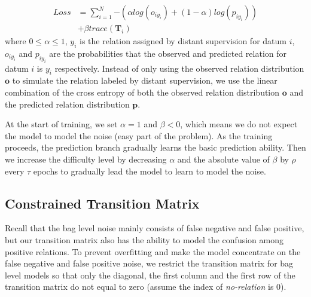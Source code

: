 \begin{equation}
\begin{aligned}
Loss	&=\sum_{i=1}^N{-(\alpha log(o_{iy_{i}}) + (1-\alpha) log(p_{iy_{i}}))} \\
&+ \beta trace(\mathbf{T}_{i})
\end{aligned}
\end{equation}
where $0\le\alpha\le1$, $y_i$ is the relation assigned by distant supervision for datum $i$, $o_{iy_{i}}$ and $p_{iy_{i}}$ are the probabilities that the observed and predicted relation for datum $i$ is $y_i$ respectively. Instead of only using the observed relation distribution $\mathbf{o}$ to simulate the relation labeled by distant supervision, we use the linear combination of the cross entropy of both the observed relation distribution $\mathbf{o}$ and the predicted relation distribution $\mathbf{p}$. 

At the start of training, we set $\alpha=1$ and $\beta<0$, which means we do not expect the model to model the noise (easy part of the problem). As the training proceeds, the prediction branch gradually learns the basic prediction ability. Then we increase the difficulty level by decreasing $\alpha$ and the absolute value of $\beta$ by $\rho$ every $\tau$ epochs to gradually lead the model to learn to model the noise.  

\subsection{Constrained Transition Matrix}
Recall that the bag level noise mainly consists of false negative and false positive, but our transition matrix also has the ability to model the confusion among positive relations. To prevent overfitting and make the model concentrate on the false negative and false positive noise, we restrict the transition matrix for bag level models so that only the diagonal, the first column and the first row of the transition matrix do not equal to zero (assume the index of \emph{no-relation} is 0).  
